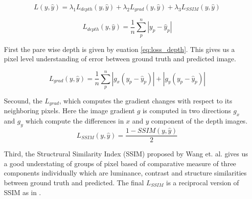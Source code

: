 \begin{equation} \label{eq:loss}
       L(y, \hat{y}) = \lambda_{1} L_{depth}(y, \hat{y}) + \lambda_{2} L_{grad}(y, \hat{y}) + \lambda_{3} L_{SSIM}(y, \hat{y})
\end{equation}






\begin{equation} \label{eq:loss_depth}
      L_{depth}(y, \hat{y})= \frac{1}{n} \sum_{p}^{n} \left|y_{p} - \hat{y}_{p} \right|
\end{equation}

First the pare wise depth is given by euation \ref{eq:loss_depth}. This gives us a pixel level understanding of error between ground truth and predicted image.  

\begin{equation} \label{eq:loss_grad}
       L_{grad}(y, \hat{y}) =  \frac{1}{n} \sum_{p}^{n} \left| g_{x} (y_{p} - \hat{y}_{p}) \right| + \left| g_{y} (y_{p} - \hat{y}_{p}) \right|
\end{equation}


Secound, the \(L_{grad}\), which computes the gradient changes with respect to its neighboring pixels. Here the image gradient \(g\) is computed in two directions \(g_{x}\) and \(g_{y}\) which compute the differences in \(x\) and \(y\) component of the depth images. \\


\begin{equation} \label{eq:loss_SSIM}
       L_{SSIM}(y, \hat{y}) = \frac{1- SSIM(y, \hat{y})}{2}
\end{equation}

Third, the Structrural Similarity Index (SSIM) proposed by Wang et. al. \cite{wang2004image} gives us a good understating of groups of pixel based of comparative measure of three components individually which are luminance, contrast and structure similarities between ground truth and predicted. The final \(L_{SSIM}\) is a reciprocal version of SSIM as in \cite{Alhashim2018,  ummenhofer2017demon, huang2018deepmvs}.


